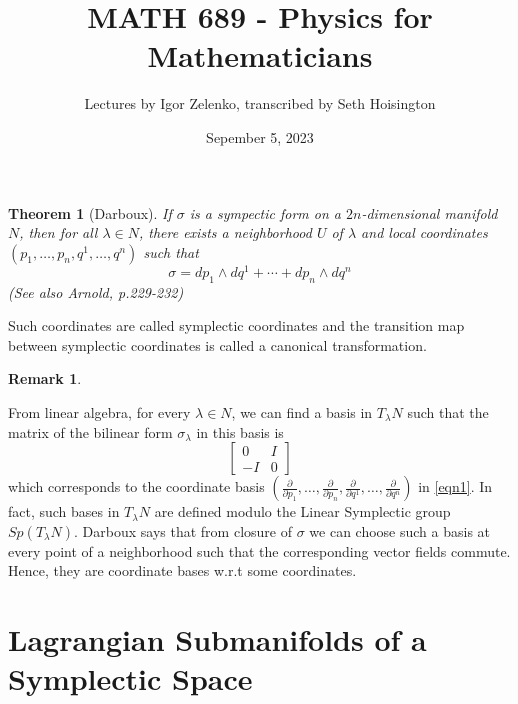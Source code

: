 \documentclass{article}
\title{MATH 689 - Physics for Mathematicians}
\author{Lectures by Igor Zelenko, transcribed by Seth Hoisington}
\date{Sepember 5, 2023}
\newcommand{\pd}[1]{\frac{\partial}{\partial #1}}
\newtheorem{thm}{Theorem}
\newtheorem{rk}{Remark}
\begin{document}
\maketitle
\begin{thm}[Darboux]
    If $\sigma$ is a sympectic form on a $2n$-dimensional manifold $N$, then for all $\lambda\in N$, there exists a neighborhood $U$ of $\lambda$ and local coordinates $(p_1,\dots,p_n,q^1,\dots,q^n)$ such that
    \[\sigma = dp_1\wedge dq^1 + \cdots + dp_n\wedge dq^n\label{eqn1}\]
    (See also Arnold, p.229-232)
\end{thm}
Such coordinates are called symplectic coordinates and the transition map between symplectic coordinates is called a canonical transformation.
\begin{rk}
    
\end{rk}
From linear algebra, for every $\lambda\in N$, we can find a basis in $T_\lambda N$ such that the matrix of the bilinear form $\sigma_\lambda$ in this basis is
\[\begin{bmatrix}
    0 & I \\ -I & 0
\end{bmatrix}\]
which corresponds to the coordinate basis $\left(\pd{p_1},\dots,\pd{p_n},\pd{q^1},\dots,\pd{q^n}\right)$ in \eqref{eqn1}. In fact, such bases in $T_\lambda N$ are defined modulo the Linear Symplectic group $Sp(T_\lambda N)$. Darboux says that from closure of $\sigma$ we can choose such a basis at every point of a neighborhood such that the corresponding vector fields commute. Hence, they are coordinate bases w.r.t some coordinates.
\section{Lagrangian Submanifolds of a Symplectic Space}
\end{document}
